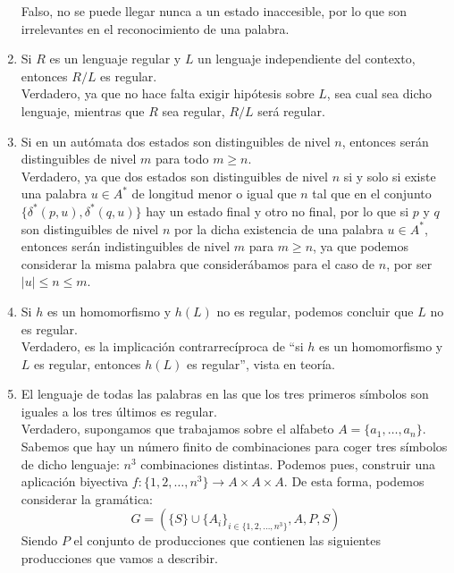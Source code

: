 \begin{enumerate}
        Falso, no se puede llegar nunca a un estado inaccesible, por lo que son irrelevantes en el reconocimiento de una palabra.
    \item Si $R$ es un lenguaje regular y $L$ un lenguaje independiente del contexto, entonces $R/L$ es regular.\\

        Verdadero, ya que no hace falta exigir hipótesis sobre $L$, sea cual sea dicho lenguaje, mientras que $R$ sea regular, $R/L$ será regular.
    \item Si en un autómata dos estados son distinguibles de nivel $n$, entonces serán distinguibles de nivel $m$ para todo $m\geq n$.\\

        Verdadero, ya que dos estados son distinguibles de nivel $n$ si y solo si existe una palabra $u\in A^\ast$ de longitud menor o igual que $n$ tal que en el conjunto $\{\delta^\ast(p,u),\delta^\ast(q,u)\}$ hay un estado final y otro no final, por lo que si $p$ y $q$ son distinguibles de nivel $n$ por la dicha existencia de una palabra $u\in A^\ast$, entonces serán indistinguibles de nivel $m$ para $m\geq n$, ya que podemos considerar la misma palabra que considerábamos para el caso de $n$, por ser $|u|\leq n\leq m$.
    \item Si $h$ es un homomorfismo y $h(L)$ no es regular, podemos concluir que $L$ no es regular.\\

        Verdadero, es la implicación contrarrecíproca de ``si $h$ es un homomorfismo y $L$ es regular, entonces $h(L)$ es regular'', vista en teoría.
    \item El lenguaje de todas las palabras en las que los tres primeros símbolos son iguales a los tres últimos es regular.\\

        Verdadero, supongamos que trabajamos sobre el alfabeto $A = \{a_1,\ldots,a_n\}$. Sabemos que hay un número finito de combinaciones para coger tres símbolos de dicho lenguaje: $n^3$ combinaciones distintas. Podemos pues, construir una aplicación biyectiva $f:\{1,2,\ldots,n^3\}\rightarrow A\times A\times A$. De esta forma, podemos considerar la gramática:
        \begin{equation*}
            G = (\{S\}\cup \{A_i\}_{i \in \{1,2,\ldots,n^3\}}, A, P, S)
        \end{equation*}
        Siendo $P$ el conjunto de producciones que contienen las siguientes producciones que vamos a describir.


\end{enumerate}
